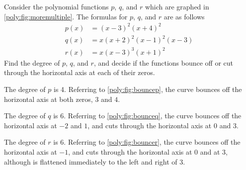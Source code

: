 \begin{pccexample}
Consider the polynomial functions $p$, $q$, and $r$ which are 
graphed in \cref{poly:fig:moremultiple}. 
The formulas for $p$, $q$, and $r$ are as follows
\begin{align*}
		p(x)&=(x-3)^2(x+4)^2\\
		q(x)&=x(x+2)^2(x-1)^2(x-3)\\
		r(x)&=x(x-3)^3(x+1)^2
\end{align*}
Find the degree of $p$, $q$, and $r$, and decide if the functions bounce off or cut 
through the horizontal axis at each of their zeros.
\begin{pccsolution}
The degree of $p$ is 4. Referring to \cref{poly:fig:bouncep}, 
      the curve bounces off the horizontal axis at both zeros, $3$ and $4$.

The degree of $q$ is 6. Referring to \cref{poly:fig:bounceq},
the curve bounces off the horizontal axis at $-2$ and $1$, and cuts 
through the horizontal axis at $0$ and $3$.

The degree of $r$ is 6. Referring to \cref{poly:fig:bouncer},
the curve bounces off the horizontal axis at $-1$, and cuts through 
the horizontal axis at $0$ and at $3$, although is flattened immediately to the left and right of $3$.
\end{pccsolution}
\end{pccexample}

